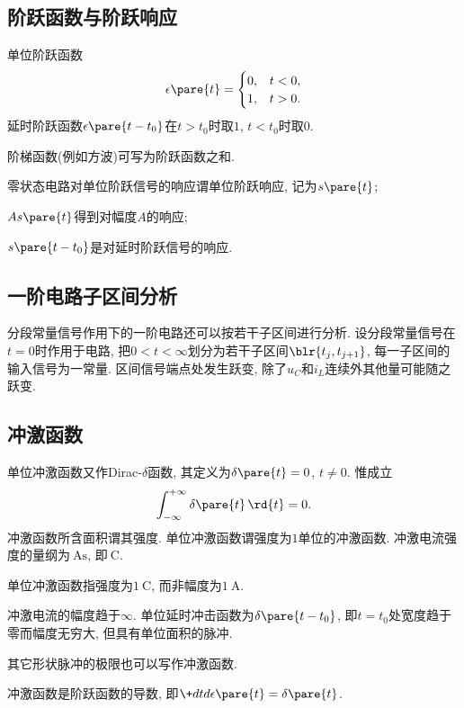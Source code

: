 \documentclass{ctexart}
\begin{document}

\subsection{阶跃函数与阶跃响应} %
\label{sub:阶跃函数与阶跃响应}

单位阶跃函数
\[ \epsilon\pare{t} = \begin{cases}
    0, & t<0, \\
    1, & t>0.
\end{cases} \]
延时阶跃函数$\epsilon\pare{t-t_0}$在$t>t_0$时取$1$, $t<t_0$时取$0$.
\par
阶梯函数(例如方波)可写为阶跃函数之和.
\begin{cenum}
    \item 零状态电路对单位阶跃信号的响应谓单位阶跃响应, 记为$s\pare{t}$;
    \item $As\pare{t}$得到对幅度$A$的响应;
    \item $s\pare{t-t_0}$是对延时阶跃信号的响应.
\end{cenum}


\subsection{一阶电路子区间分析} %
\label{sub:一阶电路子区间分析}

分段常量信号作用下的一阶电路还可以按若干子区间进行分析. 设分段常量信号在$t=0$时作用于电路, 把$0<t<\infty$划分为若干子区间$\blr{t_j,t_{j+1}}$, 每一子区间的输入信号为一常量. 区间信号端点处发生跃变, 除了$u_C$和$i_L$连续外其他量可能随之跃变.


\subsection{冲激函数} %
\label{sub:冲激函数}

单位冲激函数又作Dirac-$\delta$函数, 其定义为$\delta\pare{t} = 0$, $t\neq 0$. 惟成立
\[ \int_{-\infty}^{+\infty} \delta\pare{t}\,\rd{t} = 0. \]
冲激函数所含面积谓其强度. 单位冲激函数谓强度为$1$单位的冲激函数. 冲激电流强度的量纲为$\SI{}{\ampere\second}$, 即$\SI{}{\coulomb}$.
\begin{pitfall}
    单位冲激函数指强度为$\SI{1}{\coulomb}$, 而非幅度为$\SI{1}{\ampere}$.
\end{pitfall}
冲激电流的幅度趋于$\infty$. 单位延时冲击函数为$\delta\pare{t-t_0}$, 即$t=t_0$处宽度趋于零而幅度无穷大, 但具有单位面积的脉冲.
\begin{remark}
    其它形状脉冲的极限也可以写作冲激函数.
\end{remark}
冲激函数是阶跃函数的导数, 即$\displaystyle \+dtd{\epsilon\pare{t}} = \delta\pare{t}$.
\end{document}
